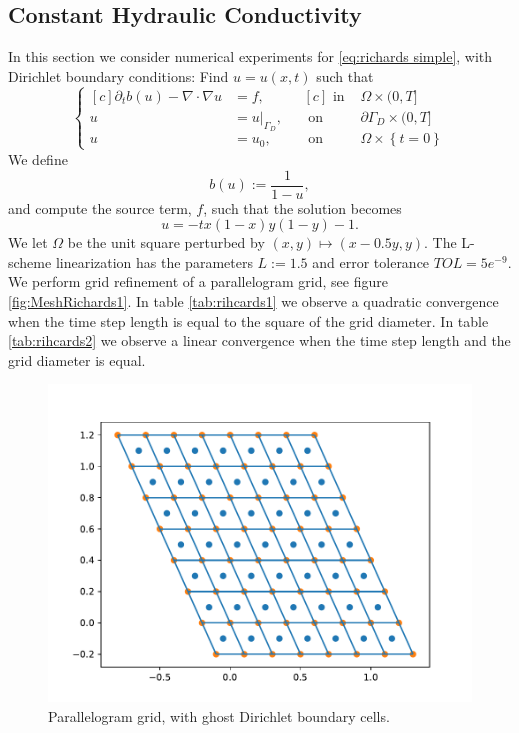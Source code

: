 \documentclass[../Main/main.tex]{subfiles}
\begin{document}
	\subsection{Constant Hydraulic Conductivity}
	In this section we consider numerical experiments for \eqref{eq:richards simple}, with Dirichlet boundary conditions: Find $u=u(x,t)$ such that
	\begin{equation}\label{eq:richards_conv_1}
			\left \{
		\begin{aligned}[c]
			\partial_t b(u) - \nabla \cdot \nabla u &= f, \\
			u &= u|_{\Gamma_D}, \\
			u &= u_0,
		\end{aligned}
		\ \ \
		\begin{aligned}[c]
			\text{ in }& \Omega \times (0,T]\\
			\text{ on }& \partial \Gamma_D \times (0,T]\\
			\text{ on }& \Omega \times \left\{t=0\right \}
		\end{aligned}
		\right.
	\end{equation}
	We define 
	\begin{equation}\label{eq:richards_conv_2}
		b(u):=\frac{1}{1-u},
	\end{equation}
	and compute the source term, $f$, such that the solution becomes
	\begin{equation}\label{eq:richards_conv_3}
		u = -tx(1-x)y(1-y)-1.
	\end{equation}
	We let $\Omega$ be the unit square perturbed by $(x,y)  \mapsto (x-0.5y,y)$.
	The L-scheme linearization has the parameters $L:=1.5$ and error tolerance $TOL=5e^{-9}$. We perform grid refinement of a parallelogram  grid, see figure \eqref{fig:MeshRichards1}. In table \ref{tab:rihcards1} we observe a quadratic convergence when the time step length is equal to the square of the grid diameter. In table \ref{tab:rihcards2} we observe a linear convergence when the time step length and the grid diameter is equal.
	\begin{figure}[H]
	\centering
	\includegraphics[width=0.8\linewidth]{MeshRichards1.pdf}
	\caption{Parallelogram grid, with ghost Dirichlet boundary cells.}
	\label{fig:MeshRichards1}
	\end{figure}
\end{document}
